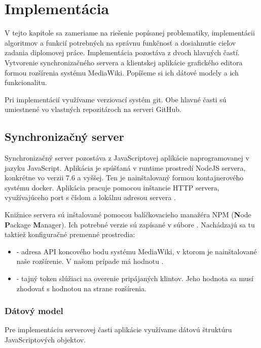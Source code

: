 \chapter{Implementácia}\label{chap:implementation}
V tejto kapitole sa zameriame na riešenie popísanej problematiky, implementácii algoritmov a funkcií potrebných na správnu funkčnosť a dosiahnutie cieľov zadania diplomovej práce. Implementácia pozostáva z dvoch hlavných častí. Vytvorenie synchronizačného servera a klientskej aplikácie grafického editora formou rozšírenia systému MediaWiki. Popíšeme si ich dátové modely a ich funkcionalitu. 

Pri implementácií využívame verziovací systém git. Obe hlavné časti sú umiestnené vo vlastných repozitároch na serveri GitHub. 

\section{Synchronizačný server}
Synchronizačný server pozostáva z JavaScriptovej aplikácie naprogramovanej v jazyku JavaScript. Aplikácia je spúšťaná v runtime prostredí NodeJS servera, konkrétne vo verzii 7.6 a vyššej. Ten je nainštalovaný formou kontajnerového systému docker. Aplikácia pracuje pomocou inštancie HTTP servera, využívajúceho port s číslom  a lokálnu adresou servera . 

Knižnice servera sú inštalované pomocou balíčkovacieho manažéra NPM (\textbf{N}ode \textbf{P}ackage \textbf{M}anager). Ich potrebné verzie sú zapísané v súbore . Nachádzajú sa tu taktiež konfiguračné premenné prostredia:

\begin{itemize}
	\item {} - adresa API koncového bodu systému MediaWiki, v ktorom je nainštalované naše rozšírenie. V našom prípade má hodnotu .
	
	\item {} - tajný token slúžiaci na overenie pripájaných klintov. Jeho hodnota sa musí zhodovať s hodnotou na strane rozšírenia.
\end{itemize}

\subsection{Dátový model}
Pre implementáciu serverovej časti aplikácie využívame dátovú štruktúru JavaScriptových objektov.

